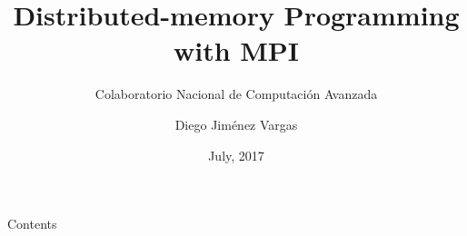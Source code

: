 
\institution{\BLANKSPACE}
\department{\BLANKSPACE}
\subdepartment{\BLANKSPACE}

\subject{\BLANKSPACE}
\code{\BLANKSPACE}
\title{Distributed-memory Programming with MPI}
\subtitle{Colaboratorio Nacional de Computación Avanzada}


\author{Diego Jiménez Vargas}
\date{July, 2017}
\place{\BLANKSPACE}

\titlePage

\begin{frame}{Contents}


\tableofcontents{}


\end{frame}